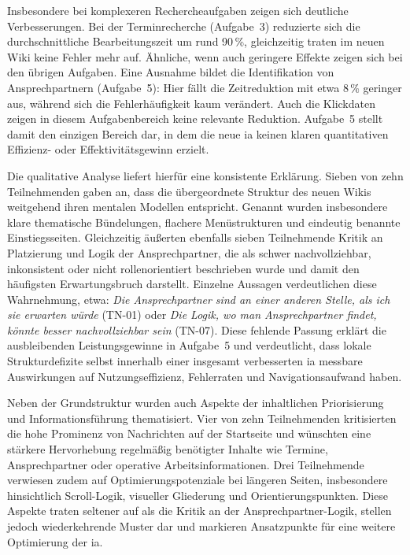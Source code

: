Insbesondere bei komplexeren Rechercheaufgaben zeigen sich deutliche Verbesserungen. Bei der Terminrecherche (Aufgabe~3) reduzierte sich die durchschnittliche Bearbeitungszeit um rund 90\,\%, gleichzeitig traten im neuen Wiki keine Fehler mehr auf. Ähnliche, wenn auch geringere Effekte zeigen sich bei den übrigen Aufgaben. Eine Ausnahme bildet die Identifikation von Ansprechpartnern (Aufgabe~5): Hier fällt die Zeitreduktion mit etwa 8\,\% geringer aus, während sich die Fehlerhäufigkeit kaum verändert. Auch die Klickdaten zeigen in diesem Aufgabenbereich keine relevante Reduktion. Aufgabe~5 stellt damit den einzigen Bereich dar, in dem die neue \Gls{ia} keinen klaren quantitativen Effizienz- oder Effektivitätsgewinn erzielt.

Die qualitative Analyse liefert hierfür eine konsistente Erklärung. Sieben von zehn Teilnehmenden gaben an, dass die übergeordnete Struktur des neuen Wikis weitgehend ihren mentalen Modellen entspricht. Genannt wurden insbesondere klare thematische Bündelungen, flachere Menüstrukturen und eindeutig benannte Einstiegsseiten. Gleichzeitig äußerten ebenfalls sieben Teilnehmende Kritik an Platzierung und Logik der Ansprechpartner, die als schwer nachvollziehbar, inkonsistent oder nicht rollenorientiert beschrieben wurde und damit den häufigsten Erwartungsbruch darstellt. Einzelne Aussagen verdeutlichen diese Wahrnehmung, etwa:
\textit{\glqq Die Ansprechpartner sind an einer anderen Stelle, als ich sie erwarten würde\grqq{}} (TN-01) oder
\textit{\glqq Die Logik, wo man Ansprechpartner findet, könnte besser nachvollziehbar sein\grqq{}} (TN-07).
Diese fehlende Passung erklärt die ausbleibenden Leistungsgewinne in Aufgabe~5 und verdeutlicht, dass lokale Strukturdefizite selbst innerhalb einer insgesamt verbesserten \Gls{ia} messbare Auswirkungen auf Nutzungseffizienz, Fehlerraten und Navigationsaufwand haben.

Neben der Grundstruktur wurden auch Aspekte der inhaltlichen Priorisierung und Informationsführung thematisiert. Vier von zehn Teilnehmenden kritisierten die hohe Prominenz von Nachrichten auf der Startseite und wünschten eine stärkere Hervorhebung regelmäßig benötigter Inhalte wie Termine, Ansprechpartner oder operative Arbeitsinformationen. Drei Teilnehmende verwiesen zudem auf Optimierungspotenziale bei längeren Seiten, insbesondere hinsichtlich Scroll-Logik, visueller Gliederung und Orientierungspunkten. Diese Aspekte traten seltener auf als die Kritik an der Ansprechpartner-Logik, stellen jedoch wiederkehrende Muster dar und markieren Ansatzpunkte für eine weitere Optimierung der \Gls{ia}.

